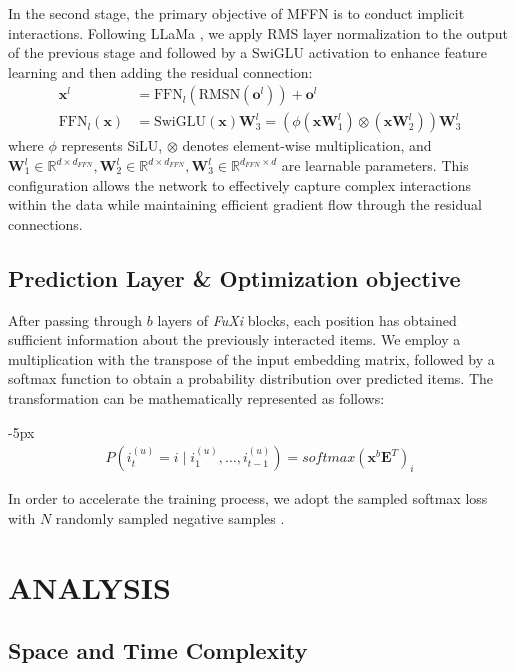 In the second stage, the primary objective of MFFN is to conduct  implicit interactions. Following LLaMa \cite{touvron2023llama}, we apply RMS layer normalization to the output of the previous stage and followed by a SwiGLU activation \cite{shazeer2020glu} to enhance feature learning and then adding the residual connection:
\begin{align}
\mathbf{x}^{l} &= \text{FFN}_l (\text{RMSN}(\mathbf{o}^{l})) + \mathbf{o}^{l} \\
\text{FFN}_l(\mathbf{x}) &= \text{SwiGLU}(\mathbf{x})\mathbf{W}_3^l = (\phi(\mathbf{x} \mathbf{W}_1^l) \otimes (\mathbf{x} \mathbf{W}_2^l)) \mathbf{W}_3^l
\end{align}
where $\phi$ represents SiLU, $\otimes$ denotes element-wise multiplication, and $\mathbf{W}_1^l \in \mathbb{R}^{d\times d_{FFN}}, \mathbf{W}_2^l \in \mathbb{R}^{d\times d_{FFN}}, \mathbf{W}_3^l \in \mathbb{R}^{d_{FFN}\times d}$ are learnable parameters. This configuration allows the network to effectively capture complex interactions within the data while maintaining efficient gradient flow through the residual connections.

\subsection{Prediction Layer \& Optimization objective}

After passing through $b$ layers of \textit{FuXi} blocks, each position has obtained sufficient information about the previously interacted items. We employ a multiplication with the transpose of the input embedding matrix, followed by a softmax function to obtain a probability distribution over predicted items. The transformation can be mathematically represented as follows:
\begin{shrinkeq}{-5px}
\begin{align}
    P\left(i_{t}^{(u)} = i \mid i_1^{(u)}, \dots, i_{t-1}^{(u)} \right) = softmax\left (\mathbf x^{b} \mathbf E^T   \right)_i
\end{align}
\end{shrinkeq}
In order to accelerate the training process, we adopt the sampled softmax loss with $N$ randomly sampled negative samples \cite{Klenitskiy_2023}.

\section{ANALYSIS}

\subsection{Space and Time Complexity}

